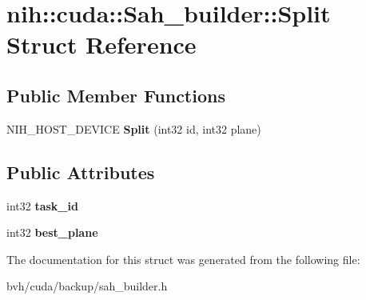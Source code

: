 \hypertarget{structnih_1_1cuda_1_1_sah__builder_1_1_split}{
\section{nih\-:\-:cuda\-:\-:\-Sah\-\_\-builder\-:\-:\-Split \-Struct \-Reference}
\label{structnih_1_1cuda_1_1_sah__builder_1_1_split}
}
\subsection*{\-Public \-Member \-Functions}
\begin{DoxyCompactItemize}
\item 
\hypertarget{structnih_1_1cuda_1_1_sah__builder_1_1_split_acd5358f19500d3b3a424bf51e898d416}{
\-N\-I\-H\-\_\-\-H\-O\-S\-T\-\_\-\-D\-E\-V\-I\-C\-E {\bfseries \-Split} (int32 id, int32 plane)}
\label{structnih_1_1cuda_1_1_sah__builder_1_1_split_acd5358f19500d3b3a424bf51e898d416}

\end{DoxyCompactItemize}
\subsection*{\-Public \-Attributes}
\begin{DoxyCompactItemize}
\item 
\hypertarget{structnih_1_1cuda_1_1_sah__builder_1_1_split_aba7f0b702f61ee28d55501ec45191f0f}{
int32 {\bfseries task\-\_\-id}}
\label{structnih_1_1cuda_1_1_sah__builder_1_1_split_aba7f0b702f61ee28d55501ec45191f0f}

\item 
\hypertarget{structnih_1_1cuda_1_1_sah__builder_1_1_split_a1223d0b86ef5128db5f026cacb92ed89}{
int32 {\bfseries best\-\_\-plane}}
\label{structnih_1_1cuda_1_1_sah__builder_1_1_split_a1223d0b86ef5128db5f026cacb92ed89}

\end{DoxyCompactItemize}


\-The documentation for this struct was generated from the following file\-:\begin{DoxyCompactItemize}
\item 
bvh/cuda/backup/sah\-\_\-builder.\-h\end{DoxyCompactItemize}
